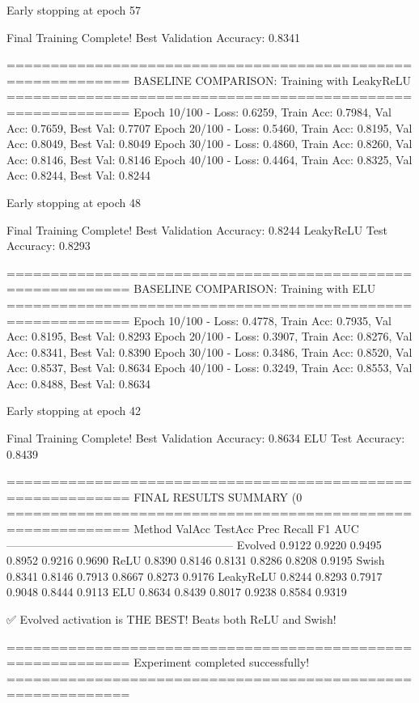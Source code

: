 Early stopping at epoch 57

Final Training Complete!
Best Validation Accuracy: 0.8341

============================================================
BASELINE COMPARISON: Training with LeakyReLU
============================================================
Epoch  10/100 - Loss: 0.6259, Train Acc: 0.7984, Val Acc: 0.7659, Best Val: 0.7707
Epoch  20/100 - Loss: 0.5460, Train Acc: 0.8195, Val Acc: 0.8049, Best Val: 0.8049
Epoch  30/100 - Loss: 0.4860, Train Acc: 0.8260, Val Acc: 0.8146, Best Val: 0.8146
Epoch  40/100 - Loss: 0.4464, Train Acc: 0.8325, Val Acc: 0.8244, Best Val: 0.8244

Early stopping at epoch 48

Final Training Complete!
Best Validation Accuracy: 0.8244
LeakyReLU Test Accuracy: 0.8293

============================================================
BASELINE COMPARISON: Training with ELU
============================================================
Epoch  10/100 - Loss: 0.4778, Train Acc: 0.7935, Val Acc: 0.8195, Best Val: 0.8293
Epoch  20/100 - Loss: 0.3907, Train Acc: 0.8276, Val Acc: 0.8341, Best Val: 0.8390
Epoch  30/100 - Loss: 0.3486, Train Acc: 0.8520, Val Acc: 0.8537, Best Val: 0.8634
Epoch  40/100 - Loss: 0.3249, Train Acc: 0.8553, Val Acc: 0.8488, Best Val: 0.8634

Early stopping at epoch 42

Final Training Complete!
Best Validation Accuracy: 0.8634
ELU Test Accuracy: 0.8439

============================================================
FINAL RESULTS SUMMARY (0%
============================================================
Method             ValAcc     TestAcc    Prec       Recall     F1         AUC
------------------------------------------------------------
Evolved            0.9122     0.9220     0.9495     0.8952     0.9216     0.9690
ReLU               0.8390     0.8146     0.8131     0.8286     0.8208     0.9195
Swish              0.8341     0.8146     0.7913     0.8667     0.8273     0.9176
LeakyReLU          0.8244     0.8293     0.7917     0.9048     0.8444     0.9113
ELU                0.8634     0.8439     0.8017     0.9238     0.8584     0.9319

✅ Evolved activation is THE BEST! Beats both ReLU and Swish!

============================================================
Experiment completed successfully!
============================================================

